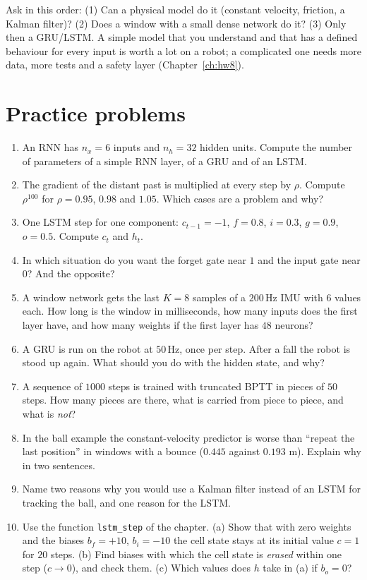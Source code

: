 \begin{aibox}
Ask in this order: (1) Can a physical model do it (constant velocity, friction, a Kalman filter)? (2) Does a window with a small dense network do it? (3) Only then a GRU/LSTM. A simple model that you understand and that has a defined behaviour for every input is worth a lot on a robot; a complicated one needs more data, more tests and a safety layer (Chapter~\ref{ch:hw8}).
\end{aibox}

\section*{Practice problems}
\begin{enumerate}[label=\textbf{\thechapter.\arabic*}]
  \item An RNN has $n_x=6$ inputs and $n_h=32$ hidden units. Compute the number of parameters of a simple RNN layer, of a GRU and of an LSTM.
  \item The gradient of the distant past is multiplied at every step by $\rho$. Compute $\rho^{100}$ for $\rho=0.95$, $0.98$ and $1.05$. Which cases are a problem and why?
  \item One LSTM step for one component: $c_{t-1}=-1$, $f=0.8$, $i=0.3$, $g=0.9$, $o=0.5$. Compute $c_t$ and $h_t$.
  \item In which situation do you want the forget gate near $1$ and the input gate near $0$? And the opposite?
  \item A window network gets the last $K=8$ samples of a $200$\,Hz IMU with $6$ values each. How long is the window in milliseconds, how many inputs does the first layer have, and how many weights if the first layer has $48$ neurons?
  \item A GRU is run on the robot at $50$\,Hz, once per step. After a fall the robot is stood up again. What should you do with the hidden state, and why?
  \item A sequence of $1000$ steps is trained with truncated BPTT in pieces of $50$ steps. How many pieces are there, what is carried from piece to piece, and what is \emph{not}?
  \item In the ball example the constant-velocity predictor is worse than ``repeat the last position'' in windows with a bounce ($0.445$ against $0.193$ m). Explain why in two sentences.
  \item Name two reasons why you would use a Kalman filter instead of an LSTM for tracking the ball, and one reason for the LSTM.
  \item[\textbf{\thechapter.10}$\star$] Use the function \texttt{lstm\_step} of the chapter. (a) Show that with zero weights and the biases $b_f=+10$, $b_i=-10$ the cell state stays at its initial value $c=1$ for $20$ steps. (b) Find biases with which the cell state is \emph{erased} within one step ($c\to0$), and check them. (c) Which values does $h$ take in (a) if $b_o=0$?
\end{enumerate}
